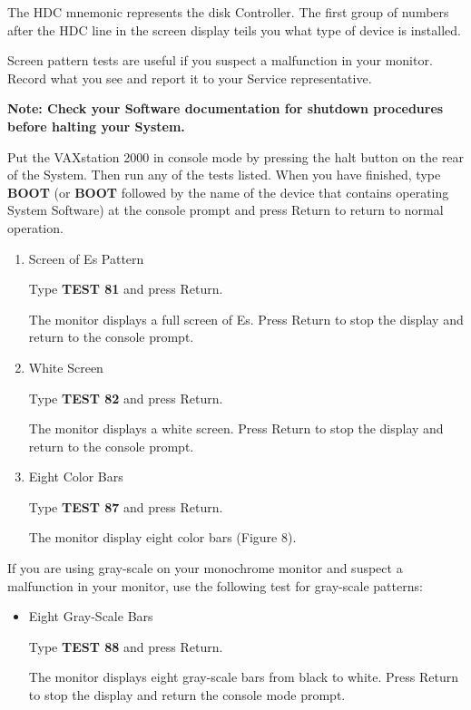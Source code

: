 \documentclass{dec}
\begin{document}
The HDC mnemonic represents the disk Controller. The first group of numbers
after the HDC line in the screen display teils you what type of device is
installed.


Screen pattern tests are useful if you suspect a malfunction in your monitor.
Record what you see and report it to your Service representative.

\textbf{Note: Check your Software documentation for shutdown procedures before halting your System.}

Put the VAXstation 2000 in console mode by pressing the halt button on the
rear of the System. Then run any of the tests listed. When you have finished,
type \textbf{BOOT} (or \textbf{BOOT} followed by the name of the device that contains
operating System Software) at the console prompt and press Return to return
to normal operation.

\newpage

\begin{enumerate}
\item Screen of Es Pattern

Type \textbf{TEST 81} and press Return.

The monitor displays a full screen of Es. Press Return to stop the display and return to the console prompt.

\item White Screen

Type \textbf{TEST 82} and press Return.

The monitor displays a white screen. Press Return to stop the display and return to the console prompt.

\item Eight Color Bars

Type \textbf{TEST 87} and press Return.

The monitor display eight color bars (Figure 8).
\end{enumerate}



If you are using gray-scale on your monochrome monitor and suspect a
malfunction in your monitor, use the following test for gray-scale patterns:
\begin{itemize}
\item Eight Gray-Scale Bars

Type \textbf{TEST 88} and press Return.

The monitor displays eight gray-scale bars from black to white.
 Press Return to stop the display and return the console mode prompt.
\end{itemize}
\end{document}
